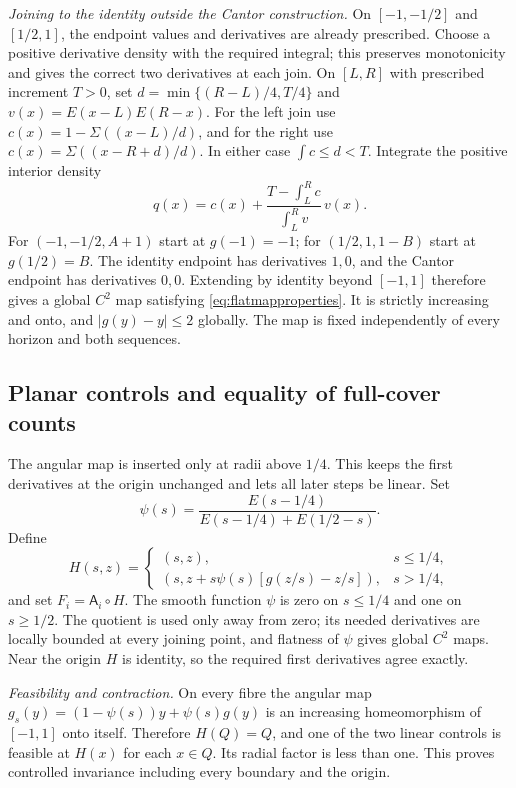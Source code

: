 \documentclass[11pt]{amsart}
\theoremstyle{definition}
\theoremstyle{remark}
\numberwithin{equation}{section}
\begin{document}
\smallskip
\emph{Joining to the identity outside the Cantor construction.}
On $[-1,-1/2]$ and $[1/2,1]$, the endpoint values and derivatives
are already prescribed. Choose a positive derivative density with
the required integral; this preserves monotonicity and gives the
correct two derivatives at each join. On $[L,R]$
with prescribed increment $T>0$, set
$d=\min\{(R-L)/4,T/4\}$ and $v(x)=E(x-L)E(R-x)$.
For the left join use $c(x)=1-\Sigma((x-L)/d)$, and for the right
use $c(x)=\Sigma((x-R+d)/d)$. In either case $\int c\le d<T$.
Integrate the positive interior density
\begin{equation}\label{eq:extensiondensity}
q(x)=c(x)+\frac{T-\int_L^R c}{\int_L^R v}\,v(x).
\end{equation}
For $(-1,-1/2,A+1)$ start at $g(-1)=-1$; for
$(1/2,1,1-B)$ start at $g(1/2)=B$.
The identity endpoint has derivatives $1,0$, and the Cantor endpoint
has derivatives $0,0$. Extending by identity beyond $[-1,1]$
therefore gives a global $C^2$ map satisfying
\eqref{eq:flatmapproperties}. It is strictly increasing and onto,
and $|g(y)-y|\le2$ globally. The map is fixed independently of
every horizon and both sequences.

\subsection{Planar controls and equality of full-cover counts}
The angular map is inserted only at radii above $1/4$. This keeps
the first derivatives at the origin unchanged and lets all later
steps be linear. Set
\[
\psi(s)=\frac{E(s-1/4)}{E(s-1/4)+E(1/2-s)}.
\]
Define
\[
H(s,z)=
\begin{cases}
(s,z),&s\le1/4,\\
(s,z+s\psi(s)[g(z/s)-z/s]),&s>1/4,
\end{cases}
\]
and set $F_i=\mathsf A_i\circ H$.
The smooth function $\psi$ is zero on $s\le1/4$ and one on
$s\ge1/2$. The quotient is used only away from zero; its needed
derivatives are locally bounded at every joining point, and flatness
of $\psi$ gives global $C^2$ maps. Near the origin $H$ is identity,
so the required first derivatives agree exactly.

\smallskip
\emph{Feasibility and contraction.}
On every fibre the angular map
$g_s(y)=(1-\psi(s))y+\psi(s)g(y)$ is an increasing homeomorphism
of $[-1,1]$ onto itself. Therefore $H(Q)=Q$, and one of the
two linear controls is feasible at $H(x)$ for each $x\in Q$.
Its radial factor is less than one. This proves controlled invariance
including every boundary and the origin.
\end{document}
